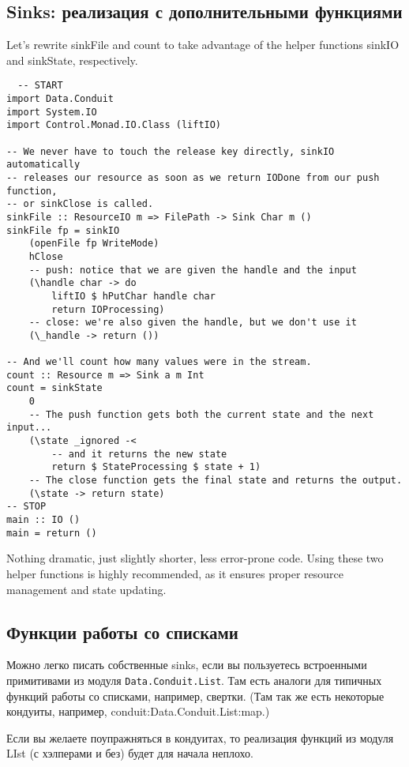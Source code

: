 \subsection{Sinks: реализация с дополнительными функциями}
Let's rewrite sinkFile and count to take advantage of the
helper functions sinkIO and sinkState, respectively.
\begin{lstlisting}
  -- START
import Data.Conduit
import System.IO
import Control.Monad.IO.Class (liftIO)

-- We never have to touch the release key directly, sinkIO automatically
-- releases our resource as soon as we return IODone from our push function,
-- or sinkClose is called.
sinkFile :: ResourceIO m => FilePath -> Sink Char m ()
sinkFile fp = sinkIO
    (openFile fp WriteMode)
    hClose
    -- push: notice that we are given the handle and the input
    (\handle char -> do
        liftIO $ hPutChar handle char
        return IOProcessing)
    -- close: we're also given the handle, but we don't use it
    (\_handle -> return ())

-- And we'll count how many values were in the stream.
count :: Resource m => Sink a m Int
count = sinkState
    0
    -- The push function gets both the current state and the next input...
    (\state _ignored -<
        -- and it returns the new state
        return $ StateProcessing $ state + 1)
    -- The close function gets the final state and returns the output.
    (\state -> return state)
-- STOP
main :: IO ()
main = return ()
\end{lstlisting}
Nothing dramatic, just slightly shorter, less error-prone code. Using these two helper
functions is highly recommended, as it ensures proper resource management and state
updating.

\subsection{Функции работы со списками}

Можно легко писать собственные sinks, если вы пользуетесь встроенными примитивами из
модуля \verb*|Data.Conduit.List|. Там есть аналоги для типичных функций работы со
списками, например, свертки. (Там так же есть некоторые кондуиты,
например, conduit:Data.Conduit.List:map.)

Если вы желаете поупражняться в кондуитах, то реализация функций из модуля LIst (с
хэлперами и без) будет для начала неплохо.

